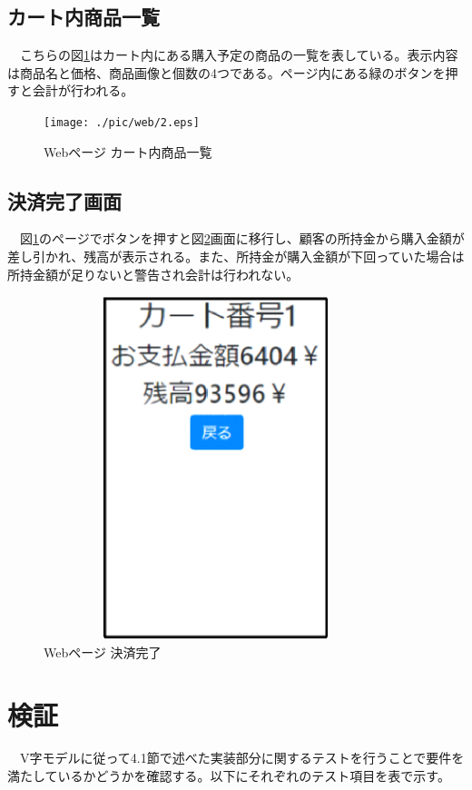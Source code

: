\subsection*{カート内商品一覧}
　こちらの図\ref{web_cart_items}はカート内にある購入予定の商品の一覧を表している。表示内容は商品名と価格、商品画像と個数の4つである。ページ内にある緑のボタンを押すと会計が行われる。
\begin{figure}[htbp]
\centering
\texttt{[image: ./pic/web/2.eps]}
\caption{Webページ カート内商品一覧}
\label{web_cart_items}
\end{figure}

\subsection*{決済完了画面}
　図\ref{web_cart_items}のページでボタンを押すと図\ref{web_checksum}画面に移行し、顧客の所持金から購入金額が差し引かれ、残高が表示される。また、所持金が購入金額が下回っていた場合は所持金額が足りないと警告され会計は行われない。
\begin{figure}[htbp]
\centering
\includegraphics[width=10cm,height=10cm]{./pic/web/3.eps}
\caption{Webページ 決済完了}
\label{web_checksum}
\end{figure}


\newpage

\section{検証}
　V字モデルに従って4.1節で述べた実装部分に関するテストを行うことで要件を満たしているかどうかを確認する。以下にそれぞれのテスト項目を表で示す。


